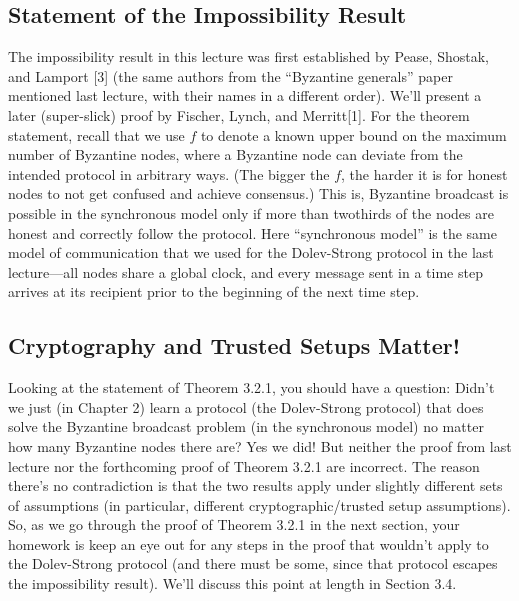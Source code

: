 \subsection{Statement of the Impossibility Result}
The impossibility result in this lecture was first established by Pease, Shostak, and Lamport [3] (the same authors from the “Byzantine generals” paper mentioned last lecture, with their names in a different order). We’ll present a later (super-slick) proof by Fischer, Lynch,
and Merritt[1]. For the theorem statement, recall that we use $f$ to denote a known upper
bound on the maximum number of Byzantine nodes, where a Byzantine node can deviate
from the intended protocol in arbitrary ways. (The bigger the $f$, the harder it is for honest
nodes to not get confused and achieve consensus.)
This is, Byzantine broadcast is possible in the synchronous model only if more than twothirds of the nodes are honest and correctly follow the protocol. Here “synchronous model” is the same model of communication that we used for the Dolev-Strong protocol in the last
lecture—all nodes share a global clock, and every message sent in a time step arrives at its
recipient prior to the beginning of the next time step.

\subsection{Cryptography and Trusted Setups Matter!}

Looking at the statement of Theorem 3.2.1, you should have a question: Didn't we just
(in Chapter 2) learn a protocol (the Dolev-Strong protocol) that does solve the Byzantine
broadcast problem (in the synchronous model) no matter how many Byzantine nodes there
are? Yes we did! But neither the proof from last lecture nor the forthcoming proof of
Theorem 3.2.1 are incorrect. The reason there’s no contradiction is that the two results apply
under slightly different sets of assumptions (in particular, different cryptographic/trusted
setup assumptions). So, as we go through the proof of Theorem 3.2.1 in the next section,
your homework is keep an eye out for any steps in the proof that wouldn't apply to the
Dolev-Strong protocol (and there must be some, since that protocol escapes the impossibility
result). We’ll discuss this point at length in Section 3.4.


